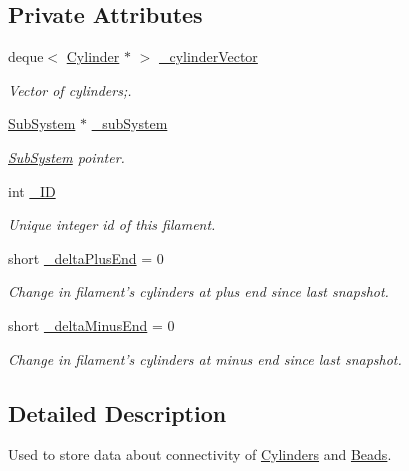 \subsection*{Private Attributes}
\begin{DoxyCompactItemize}
\item 
deque$<$ \hyperlink{classCylinder}{Cylinder} $\ast$ $>$ \hyperlink{classFilament_afb19e1c4608b762f04bdf74e12efa535}{\+\_\+cylinder\+Vector}
\begin{DoxyCompactList}\small\item\em Vector of cylinders;. \end{DoxyCompactList}\item 
\hyperlink{classSubSystem}{Sub\+System} $\ast$ \hyperlink{classFilament_acfb35439bafc3940ae7ffdbb68ae3144}{\+\_\+sub\+System}
\begin{DoxyCompactList}\small\item\em \hyperlink{classSubSystem}{Sub\+System} pointer. \end{DoxyCompactList}\item 
int \hyperlink{classFilament_a15071125666bbd624b9b290969872bdb}{\+\_\+\+I\+D}
\begin{DoxyCompactList}\small\item\em Unique integer id of this filament. \end{DoxyCompactList}\item 
short \hyperlink{classFilament_ab22323b878792e2c309417f9b8435c97}{\+\_\+delta\+Plus\+End} = 0
\begin{DoxyCompactList}\small\item\em Change in filament's cylinders at plus end since last snapshot. \end{DoxyCompactList}\item 
short \hyperlink{classFilament_ac00eb37c21190ce574738d7f5259cf58}{\+\_\+delta\+Minus\+End} = 0
\begin{DoxyCompactList}\small\item\em Change in filament's cylinders at minus end since last snapshot. \end{DoxyCompactList}\end{DoxyCompactItemize}


\subsection{Detailed Description}
Used to store data about connectivity of \hyperlink{classCylinder}{Cylinders} and \hyperlink{classBead}{Beads}. 


